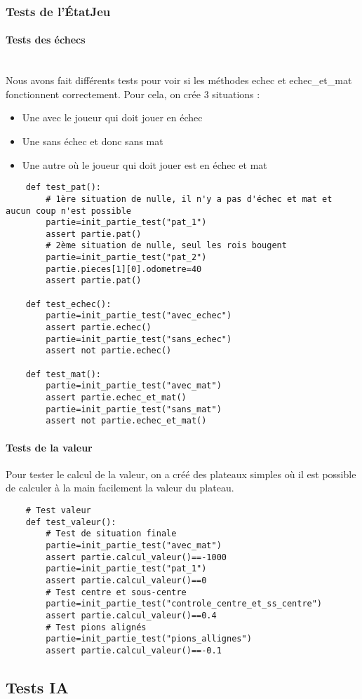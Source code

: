 \documentclass{article}
\begin{document}
\subsubsection{Tests de l'ÉtatJeu}
\paragraph{Tests des échecs}
\\
Nous avons fait différents tests pour voir si les méthodes echec et echec\_et\_mat fonctionnent correctement. Pour cela, on crée 3 situations :
\begin{itemize}
    \item Une avec le joueur qui doit jouer en échec
    \item Une sans échec et donc sans mat
    \item Une autre où le joueur qui doit jouer est en échec et mat
\end{itemize}

\begin{verbatim}
    def test_pat():
        # 1ère situation de nulle, il n'y a pas d'échec et mat et aucun coup n'est possible
        partie=init_partie_test("pat_1")
        assert partie.pat()
        # 2ème situation de nulle, seul les rois bougent
        partie=init_partie_test("pat_2")
        partie.pieces[1][0].odometre=40
        assert partie.pat()
        
    def test_echec():
        partie=init_partie_test("avec_echec")
        assert partie.echec()
        partie=init_partie_test("sans_echec")
        assert not partie.echec()
    
    def test_mat():
        partie=init_partie_test("avec_mat")
        assert partie.echec_et_mat()
        partie=init_partie_test("sans_mat")
        assert not partie.echec_et_mat()
\end{verbatim}

\paragraph{Tests de la valeur} 
Pour tester le calcul de la valeur, on a créé des plateaux simples où il est possible de calculer à la main facilement la valeur du plateau.

\begin{verbatim}
    # Test valeur
    def test_valeur():
        # Test de situation finale
        partie=init_partie_test("avec_mat")
        assert partie.calcul_valeur()==-1000
        partie=init_partie_test("pat_1")
        assert partie.calcul_valeur()==0
        # Test centre et sous-centre
        partie=init_partie_test("controle_centre_et_ss_centre")
        assert partie.calcul_valeur()==0.4
        # Test pions alignés
        partie=init_partie_test("pions_allignes")
        assert partie.calcul_valeur()==-0.1
\end{verbatim}

\subsection{Tests IA}
\end{document}
